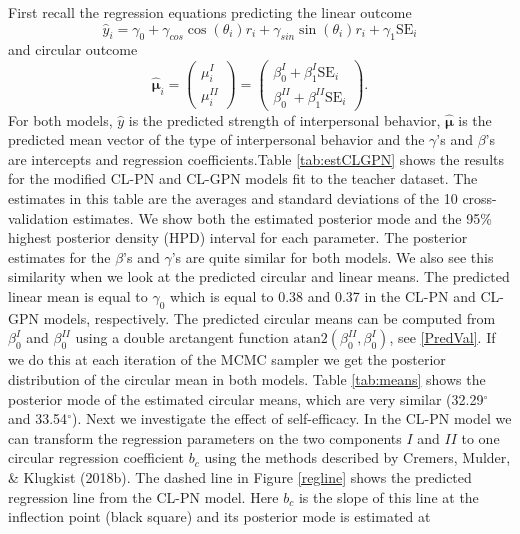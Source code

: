 \documentclass[12pt,]{article}
\begin{document}
First recall the regression equations predicting the linear outcome
\[\hat{y}_i = \gamma_0 + \gamma_{cos}\cos(\theta_i)r_i + \gamma_{sin}\sin(\theta_i)r_i + \gamma_1\text{SE}_i\]
\noindent and circular outcome
\[\hat{\boldsymbol{\mu}}_{i} = \begin{pmatrix}
  \mu_{i}^{I}  \\
\mu_{i}^{II}
 \end{pmatrix}=\begin{pmatrix}
  \beta_0^{I} + \beta_1^{I}\text{SE}_i  \\
  \beta_0^{II} + \beta_1^{II}\text{SE}_i
 \end{pmatrix}.\] \noindent  For both models, \(\hat{y}\) is the
predicted strength of interpersonal behavior, \(\hat{\boldsymbol{\mu}}\)
is the predicted mean vector of the type of interpersonal behavior and
the \(\gamma\)'s and \(\beta\)'s are intercepts and regression
coefficients.\newline \indent Table \ref{tab:estCLGPN} shows the results
for the modified CL-PN and CL-GPN models fit to the teacher dataset. The
estimates in this table are the averages and standard deviations of the
10 cross-validation estimates. We show both the estimated posterior mode
and the 95\% highest posterior density (HPD) interval for each
parameter. The posterior estimates for the \(\beta\)'s and \(\gamma\)'s
are quite similar for both models. We also see this similarity when we
look at the predicted circular and linear means. The predicted linear
mean is equal to \(\gamma_0\) which is equal to 0.38 and 0.37 in the
CL-PN and CL-GPN models, respectively. The predicted circular means can
be computed from \(\beta_0^{I}\) and \(\beta_0^{II}\) using a double
arctangent function \(\mbox{atan2}(\beta_0^{II}, \beta_0^{I})\), see
\eqref{PredVal}. If we do this at each iteration of the MCMC sampler we
get the posterior distribution of the circular mean in both models.
Table \ref{tab:means} shows the posterior mode of the estimated circular
means, which are very similar (32.29\(^\circ\) and
33.54\(^\circ\)).\newline
\indent Next we investigate the effect of self-efficacy. In the CL-PN
model we can transform the regression parameters on the two components
\(I\) and \(II\) to one circular regression coefficient \(b_c\) using
the methods described by Cremers, Mulder, \& Klugkist (2018b). The
dashed line in Figure \ref{regline} shows the predicted regression line
from the CL-PN model. Here \(b_c\) is the slope of this line at the
inflection point (black square) and its posterior mode is estimated at
\end{document}
